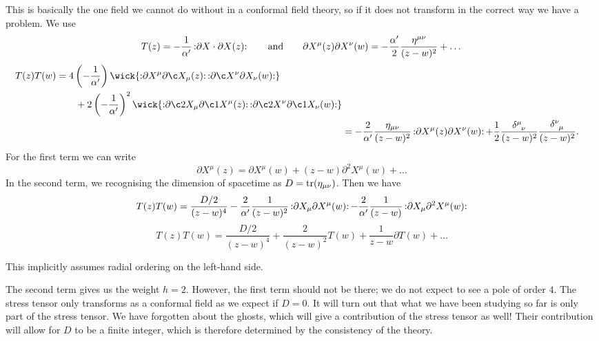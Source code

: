 This is basically the one field we cannot do without in a conformal field theory, so if it does not transform in the correct way we have a problem.
We use
\begin{equation}
  T(z) = -\frac{1}{\alpha'} \mathop{:}\nolimits\! \partial X \cdot \partial X(z)\!\mathop{:}\nolimits \qquad \text{and} \qquad 
  \partial X^{\mu}(z) \partial X^{\nu}(w) = -\frac{\alpha'}{2} \frac{\eta^{\mu\nu}}{(z - w)^2} + \dots
\end{equation}
\begin{align}
  \begin{split}
    T(z) T(w) &= 4 \left( -\frac{1}{\alpha'} \right) \wick{\normalorder{ \partial X^{\mu}  \partial \c X_{\mu}(z)} \normalorder{\partial \c X^{\nu} \partial X_{\nu} (w)}} \\
	      &\qquad {} + 2 \left( - \frac{1}{\alpha'} \right)^2 \wick{ \normalorder{\partial \c2 X_{\mu} \partial \c1 X^{\mu}(z) } \normalorder{\partial \c2 X^{\nu} \partial \c1 X_{\nu}(w)} }
  \end{split} \\
  &= -\frac{2}{\alpha'} \frac{\eta_{\mu\nu}}{(z - w)^2} \normalorder{\partial X^{\mu}(z) \partial X^{\nu}(w)} + \frac{1}{2} \frac{\delta\indices{^{\mu}_{\nu}}}{(z - w)^2} \frac{\delta\indices{^{\nu}_{\mu}}}{(z - w)^2}.
\end{align}
For the first term we can write 
\begin{equation}
  \partial X^{\mu} (z) = \partial X^{\mu}(w) + (z - w) \partial^2 X^{\mu}(w) + \dots
\end{equation}
In the second term, we recognising the dimension of spacetime as $D = \tr(\eta_{\mu\nu})$. Then we have
\begin{equation}
  T(z) T(w) = \frac{D/2}{(z - w)^4} - \frac{2}{\alpha'} \frac{1}{(z - w)^2} \mathop{:}\nolimits\!\partial X_{\mu} \partial X^{\mu} (w)\!\mathop{:}\nolimits - \frac{2}{\alpha'} \frac{1}{(z - w)} \mathop{:}\nolimits\!\partial X_{\mu} \partial^2 X^{\mu}(w)\!\mathop{:}\nolimits
\end{equation}
\begin{equation}
  \label{eq:tt-ope}
  \boxed{T(z) T(w) = \frac{D / 2}{(z - w)^4} + \frac{2}{(z - w)^2} T(w) + \frac{1}{z - w} \partial T(w) + \dots}
\end{equation}
\begin{leftbar}
  This implicitly assumes radial ordering on the left-hand side.
\end{leftbar}
The second term gives us the weight $h = 2$. However, the first term should not be there; we do not expect to see a pole of order $4$.
The stress tensor only transforms as a conformal field as we expect if $D = 0$.
It will turn out that what we have been studying so far is only part of the stress tensor.
We have forgotten about the ghosts, which will give a contribution of the stress tensor as well!
Their contribution will allow for $D$ to be a finite integer, which is therefore determined by the consistency of the theory.

